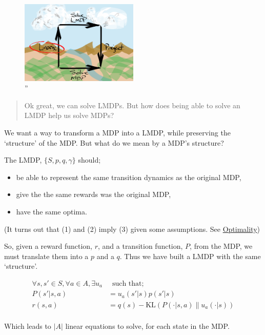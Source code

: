 \begin{figure}
\centering
\includegraphics[width=0.5\textwidth,height=0.5\textheight]{../../pictures/drawings/abstract-representations-linear.png}
\caption{''}
\end{figure}

\begin{quote}
Ok great, we can solve LMDPs. But how does being able to solve an LMDP
help us solve MDPs?
\end{quote}

We want a way to transform a MDP into a LMDP, while preserving the
`structure' of the MDP. But what do we mean by a MDP's structure?

The LMDP, \(\{S, p, q, \gamma\}\) should;

\begin{itemize}
\tightlist
\item
  be able to represent the same transition dynamics as the original MDP,
\item
  give the the same rewards was the original MDP,
\item
  have the same optima.
\end{itemize}

(It turns out that (1) and (2) imply (3) given some assumptions. See
\href{}{Optimality})

So, given a reward function, \(r\), and a transition function, \(P\),
from the MDP, we must translate them into a \(p\) and a \(q\). Thus we
have built a LMDP with the same `structure'.

\begin{align}
\forall s, s' \in S, \forall a \in A, \exists u_a& \;\;\text{such that;} \\
P(s' | s, a) &= u_a(s'|s)p(s'|s) \tag{1}\\
r(s, a) &= q(s) - \text{KL}(P(\cdot | s, a) \parallel u_a(\cdot| s) ) \tag{2}\\
\end{align}

Which leads to \(|A|\) linear equations to solve, for each state in the
MDP.

